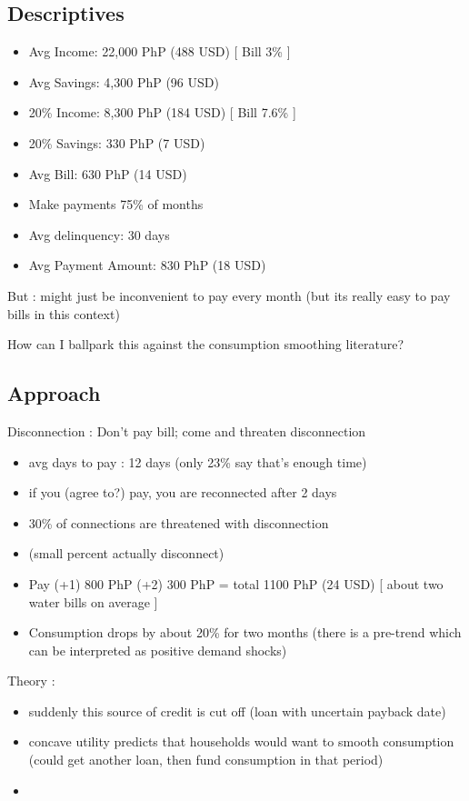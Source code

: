 \documentclass[12pt]{article}
\begin{document}
\subsection{Descriptives}
\begin{itemize}
\item Avg Income: 22,000 PhP (488 USD)   [ Bill 3\% ]
\item Avg Savings: 4,300 PhP (96 USD) 
\item 20\% Income: 8,300 PhP (184 USD)  [ Bill 7.6\% ]
\item 20\% Savings: 330 PhP (7 USD)  
\item Avg Bill: 630 PhP (14 USD)
\item Make payments 75\% of months
\item Avg delinquency: 30 days
\item Avg Payment Amount: 830 PhP (18 USD)
\end{itemize}

But : might just be inconvenient to pay every month (but its really easy to pay bills in this context)

How can I ballpark this against the consumption smoothing literature?

\subsection{Approach}

Disconnection : Don't pay bill; come and threaten disconnection
\begin{itemize}
\item avg days to pay : 12 days (only 23\% say that's enough time)
\item if you (agree to?) pay, you are reconnected after 2 days
\item 30\% of connections are threatened with disconnection
\item (small percent actually disconnect)
\item Pay (+1) 800 PhP (+2) 300 PhP = total 1100 PhP (24 USD) [ about two water bills on average ]
\item Consumption drops by about 20\% for two months (there is a pre-trend which can be interpreted as positive demand shocks)
\end{itemize}

\noindent Theory :
\begin{itemize}
\item suddenly this source of credit is cut off (loan with uncertain payback date)
\item concave utility predicts that households would want to smooth consumption (could get another loan, then fund consumption in that period)
\item 
\end{itemize}
\end{document}
